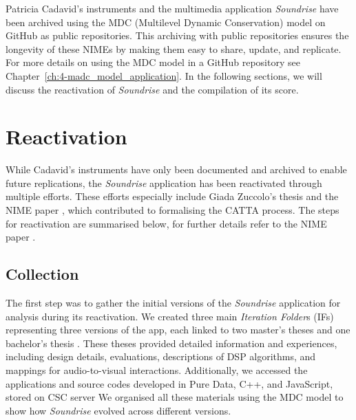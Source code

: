 \newline
Patricia Cadavid’s instruments and the multimedia application \textit{Soundrise} have been archived using the MDC (Multilevel Dynamic Conservation) model on GitHub as public repositories. This archiving with public repositories ensures the longevity of these NIMEs by making them easy to share, update, and replicate. For more details on using the MDC model in a GitHub repository see Chapter~\ref{ch:4-madc_model_application}. In the following sections, we will discuss the reactivation of \textit{Soundrise} and the compilation of its score.

\section{Reactivation}
While Cadavid's instruments have only been documented and archived to enable future replications, the \textit{Soundrise} application has been reactivated through multiple efforts. These efforts especially include Giada Zuccolo's thesis \cite{zuccolo2023soundrise} and the NIME paper \cite{fiordelmondo2024nime}, which contributed to formalising the CATTA process. The steps for reactivation are summarised below, for further details refer to the NIME paper \cite{fiordelmondo2024nime}.\\

\subsection*{Collection}
The first step was to gather the initial versions of the \textit{Soundrise} application for analysis during its reactivation. We created three main \textit{Iteration Folder}s (IFs) representing three versions of the app, each linked to two master’s theses \cite{randon2012soundrise, giusto2012soundrise} and one bachelor’s thesis \cite{turetta2023soundrise}. These theses provided detailed information and experiences, including design details, evaluations, descriptions of DSP algorithms, and mappings for audio-to-visual interactions. Additionally, we accessed the applications and source codes developed in Pure Data, C++, and JavaScript, stored on CSC server We organised all these materials using the MDC model to show how \textit{Soundrise} evolved across different versions.

